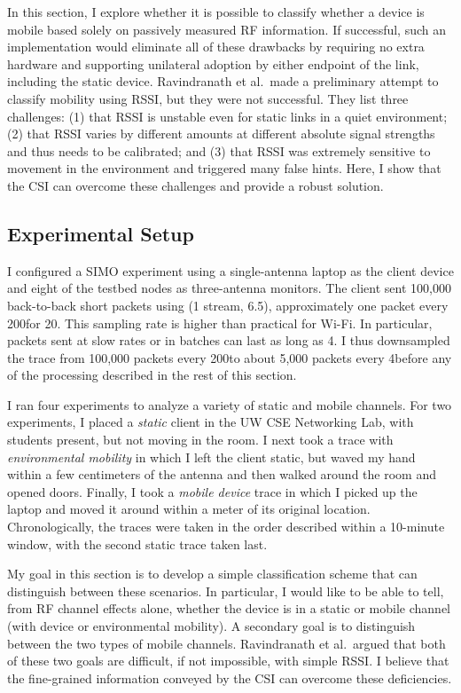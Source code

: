 In this section, I explore whether it is possible to classify whether a device is mobile based solely on passively measured RF information. If successful, such an implementation would eliminate all of these drawbacks by requiring no extra hardware and supporting unilateral adoption by either endpoint of the link, including the static device. Ravindranath et al.\ made a preliminary attempt to classify mobility using RSSI, but they were not successful. They list three challenges: (1) that RSSI is unstable even for static links in a quiet environment; (2) that RSSI varies by different amounts at different absolute signal strengths and thus needs to be calibrated; and (3) that RSSI was extremely sensitive to movement in the environment and triggered many false hints. Here, I show that the CSI can overcome these challenges and provide a robust solution.

\subsection{Experimental Setup}
I configured a SIMO experiment using a single-antenna laptop as the client device and eight of the testbed nodes as three-antenna monitors. The client sent 100,000 back-to-back short packets using  (1 stream, 6.5\Mbps), approximately one packet every 200\us for 20\s. This sampling rate is higher than practical for Wi-Fi. In particular, packets sent at slow rates or in batches can last as long as 4\ms. I thus downsampled the trace from 100,000 packets every 200\us to about 5,000 packets every 4\ms before any of the processing described in the rest of this section.

I ran four experiments to analyze a variety of static and mobile channels. For two experiments, I placed a \emph{static} client in the UW CSE Networking Lab, with students present, but not moving in the room. I next took a trace with \emph{environmental mobility} in which I left the client static, but waved my hand within a few centimeters of the antenna and then walked around the room and opened doors. Finally, I took a \emph{mobile device} trace in which I picked up the laptop and moved it around within a meter of its original location. Chronologically, the traces were taken in the order described within a 10-minute window, with the second static trace taken last.

My goal in this section is to develop a simple classification scheme that can distinguish between these scenarios. In particular, I would like to be able to tell, from RF channel effects alone, whether the device is in a static or mobile channel (with device or environmental mobility). A secondary goal is to distinguish between the two types of mobile channels. Ravindranath et al.\ argued that both of these two goals are difficult, if not impossible, with simple RSSI. I believe that the fine-grained information conveyed by the CSI can overcome these deficiencies.

